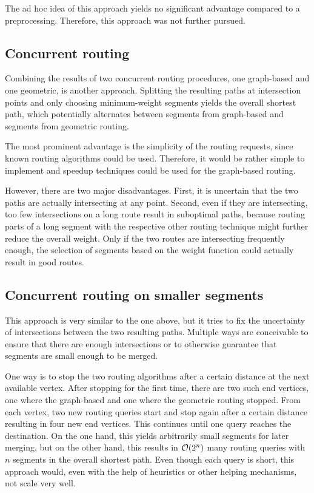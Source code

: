 		The ad hoc idea of this approach yields no significant advantage compared to a preprocessing.
		Therefore, this approach was not further pursued.
	
	\subsection{Concurrent routing}
	
		Combining the results of two concurrent routing procedures, one graph-based and one geometric, is another approach.
		Splitting the resulting paths at intersection points and only choosing minimum-weight segments yields the overall shortest path, which potentially alternates between segments from graph-based and segments from geometric routing.
		
		The most prominent advantage is the simplicity of the routing requests, since known routing algorithms could be used.
		Therefore, it would be rather simple to implement and speedup techniques could be used for the graph-based routing.
		
		However, there are two major disadvantages.
		First, it is uncertain that the two paths are actually intersecting at any point.
		Second, even if they are intersecting, too few intersections on a long route result in suboptimal paths, because routing parts of a long segment with the respective other routing technique might further reduce the overall weight.
		Only if the two routes are intersecting frequently enough, the selection of segments based on the weight function could actually result in good routes.
	
	\subsection{Concurrent routing on smaller segments}
	
		This approach is very similar to the one above, but it tries to fix the uncertainty of intersections between the two resulting paths.
		Multiple ways are conceivable to ensure that there are enough intersections or to otherwise guarantee that segments are small enough to be merged.
		
		One way is to stop the two routing algorithms after a certain distance at the next available vertex.
		After stopping for the first time, there are two such end vertices, one where the graph-based and one where the geometric routing stopped.
		From each vertex, two new routing queries start and stop again after a certain distance resulting in four new end vertices.
		This continues until one query reaches the destination.
		On the one hand, this yields arbitrarily small segments for later merging, but on the other hand, this results in $\mathcal{O}(2^n)$ many routing queries with $n$ segments in the overall shortest path.
		Even though each query is short, this approach would, even with the help of heuristics or other helping mechanisms, not scale very well.
		
